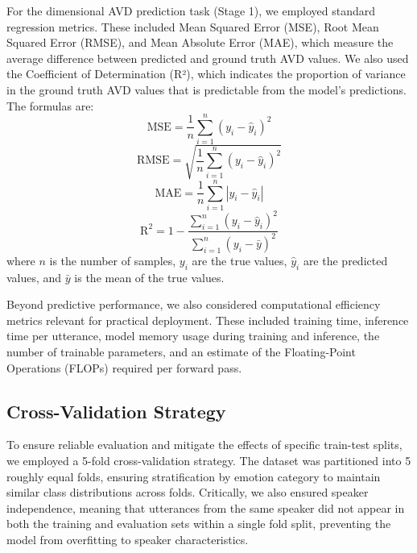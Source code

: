 \documentclass[12pt]{article}
\begin{document}
For the dimensional AVD prediction task (Stage 1), we employed standard regression metrics. These included Mean Squared Error (MSE), Root Mean Squared Error (RMSE), and Mean Absolute Error (MAE), which measure the average difference between predicted and ground truth AVD values. We also used the Coefficient of Determination (R²), which indicates the proportion of variance in the ground truth AVD values that is predictable from the model's predictions. The formulas are:
    \begin{equation}
        \text{MSE} = \frac{1}{n} \sum_{i=1}^{n} (y_i - \hat{y}_i)^2
    \end{equation}
    \begin{equation}
        \text{RMSE} = \sqrt{\frac{1}{n} \sum_{i=1}^{n} (y_i - \hat{y}_i)^2}
    \end{equation}
    \begin{equation}
        \text{MAE} = \frac{1}{n} \sum_{i=1}^{n} |y_i - \hat{y}_i|
    \end{equation}
    \begin{equation}
        \text{R}^2 = 1 - \frac{\sum_{i=1}^{n} (y_i - \hat{y}_i)^2}{\sum_{i=1}^{n} (y_i - \bar{y})^2}
    \end{equation}
where $n$ is the number of samples, $y_i$ are the true values, $\hat{y}_i$ are the predicted values, and $\bar{y}$ is the mean of the true values.

Beyond predictive performance, we also considered computational efficiency metrics relevant for practical deployment. These included training time, inference time per utterance, model memory usage during training and inference, the number of trainable parameters, and an estimate of the Floating-Point Operations (FLOPs) required per forward pass.

\subsection{Cross-Validation Strategy}
To ensure reliable evaluation and mitigate the effects of specific train-test splits, we employed a 5-fold cross-validation strategy. The dataset was partitioned into 5 roughly equal folds, ensuring stratification by emotion category to maintain similar class distributions across folds. Critically, we also ensured speaker independence, meaning that utterances from the same speaker did not appear in both the training and evaluation sets within a single fold split, preventing the model from overfitting to speaker characteristics.
\end{document}
